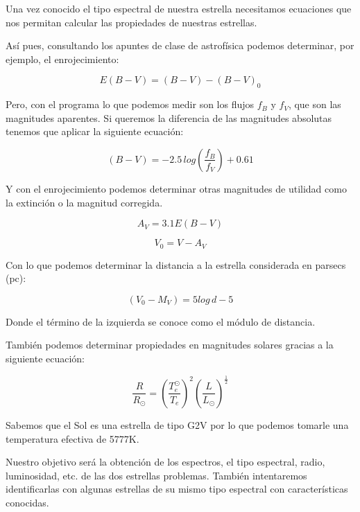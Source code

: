 \documentclass{aa} %
\begin{document}
Una vez conocido el tipo espectral de nuestra estrella necesitamos ecuaciones que nos permitan calcular las propiedades de nuestras estrellas.

Así pues, consultando los apuntes \cite{apuntes} de clase de astrofísica podemos determinar, por ejemplo, el enrojecimiento:

\begin{equation}
E(B - V) = (B - V) - (B - V)_0
\label{eq:reddening}
\end{equation}

Pero, con el programa lo que podemos medir son los flujos $f_B$ y $f_V$, que son las magnitudes aparentes. Si queremos la diferencia de las magnitudes absolutas tenemos que aplicar la siguiente ecuación:

\begin{equation}
(B-V) = -2.5 \, log \left( \frac{f_B}{f_V} \right) + 0.61
\end{equation}

Y con el enrojecimiento podemos determinar otras magnitudes de utilidad como la extinción o la magnitud corregida.

\begin{equation}
A_V = 3.1 E(B - V)
\end{equation}

\begin{equation}
V_0 = V - A_V
\end{equation}

Con lo que podemos determinar la distancia a la estrella considerada en parsecs (pc):

\begin{equation}
(V_0 - M_V) = 5 log \, d - 5
\end{equation}

Donde el término de la izquierda se conoce como el módulo de distancia.

También podemos determinar propiedades en magnitudes solares gracias a la siguiente ecuación:

\begin{equation}
\frac{R}{R_{\odot}} = \left( \frac{T_e^{\odot}}{T_e} \right)^2 \left( \frac{L}{L_{\odot}} \right)^{\frac{1}{2}}
\label{eq:apuntes}
\end{equation}

Sabemos que el Sol es una estrella de tipo G2V \cite{encyclopedia} por lo que podemos tomarle una temperatura efectiva de 5777K.

Nuestro objetivo será la obtención de los espectros, el tipo espectral, radio, luminosidad, etc. de las dos estrellas problemas. También intentaremos identificarlas con algunas estrellas de su mismo tipo espectral con características conocidas.
\end{document}
